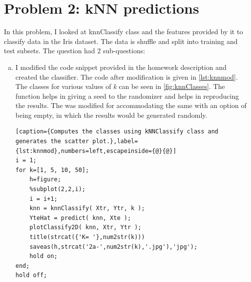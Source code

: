 \documentclass[a4paper, 11pt]{article}
\begin{document}
\section*{Problem 2: kNN predictions}
\vspace{-10pt}
In this problem, I looked at knnClassify class and the features provided by it to classify data in the Iris dataset. The data is shuffle and split into training and test subsets. The question had 2 sub-questions:
\begin{enumerate}[(a)]
\item I modified the code snippet provided in the homework description and created the classifier. The code after modification is given in \autoref{lst:knnmod}. The classes for various values of \textit{k} can be seen in \autoref{fig:knnClasses}. The  function helps in giving a seed to the randomizer and helps in reproducing the results. The  was modified for accommodating the same with an option of being empty, in which the results would be generated randomly.
\vspace{-20pt}
\begin{lstlisting}[caption={Computes the classes using kNNClassify class and generates the scatter plot.},label={lst:knnmod},numbers=left,escapeinside={@}{@}]
i = 1;
for k=[1, 5, 10, 50];
    h=figure;
    %subplot(2,2,i);
    i = i+1;
    knn = knnClassify( Xtr, Ytr, k );
    YteHat = predict( knn, Xte ); 
    plotClassify2D( knn, Xtr, Ytr );
    title(strcat({'K= '},num2str(k)))
    saveas(h,strcat('2a-',num2str(k),'.jpg'),'jpg');
    hold on;
end;
hold off;
\end{lstlisting}


\end{enumerate}
\end{document}
